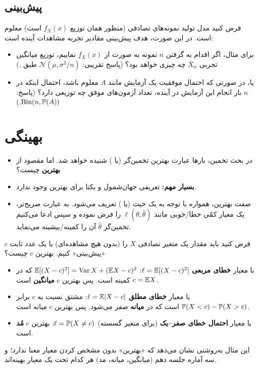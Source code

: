 \subsection{پیش‌بینی }
فرض کنید مدل تولید نمونه‌های تصادفی (منظور همان توزیع $f_X(x)$ است) معلوم است. در این صورت، هدف پیش‌بینی مقادیر تجربه مشاهدات آینده است:
\begin{itemize}
\item برای مثال، اگر اقدام به گرفتن $n$ نمونه به صورت  از $f_X(x)$ نماییم، توزیع میانگین تجربی $\bar X_n$ چه چیزی خواهد بود؟ (پاسخ تقریبی: $\mathcal N(\mu,\sigma^2/n)$ طبق .)
\item یا، در صورتی که احتمال موفقیت یک آزمایش مانند $A$ معلوم باشد، احتمال اینکه در $n$ بار انجام این آزمایش در آینده، تعداد آزمون‌های موفق چه توزیعی دارد؟ (پاسخ: $\mathrm{Bin}(n,\mathbb{P}(A))$.)
\end{itemize}

\section{بهینگی }
\begin{itemize}
\item در بحث تخمین، بارها عبارت بهترین تخمین‌گر (یا ) شنیده خواهد شد. اما مقصود از \textbf{بهترین} چیست؟
\item \textcolor{red!70!black}{\textbf{بسیار مهم:}} تعریفی جهان‌شمول و یکتا برای بهترین وجود ندارد.
\item صفت بهترین، همواره با توجه به یک حیث (یا ) تعریف می‌شود. به عبارت صریح‌تر، یک معیار کمّی خطا/خوبی مانند $\ell(\theta,\hat\theta)$ را فرض نموده و سپس ادعا می‌کنیم تخمین‌گر $\hat\theta$ آن را کمینه/بیشینه می‌نماید.
\end{itemize}

\begin{example}
فرض کنید باید مقدار یک متغیر تصادفی $X$ را (بدون هیچ مشاهده‌ای) با یک عدد ثابت $c$ «پیش‌بینی» کنیم. بهترین $c$ چیست؟
\begin{solution}
\begin{itemize}
\item با معیار \textbf{خطای مربعی} $\ell=\mathbb{E}[(X-c)^2]$: $\mathbb{E}[(X-c)^2]=\operatorname{Var} X+(\mathbb{E} X-c)^2$ که در $c=\mathbb{E} X$ کمینه است. پس بهترین $c$ \textbf{میانگین} است.
\item با معیار \textbf{خطای مطلق} $\ell=\mathbb{E}|X-c|$: مشتق نسبت به $c$ برابر $\mathbb{P}(X<c)-\mathbb{P}(X>c)$ است که در \textbf{میانه} صفر می‌شود. پس بهترین $c$ میانه است.
\item با معیار \textbf{احتمال خطای صفر--یک} (برای متغیر گسسته) $\ell=\mathbb{P}(X\ne c)$: بهترین $c$ \textbf{مُد} است.
\end{itemize}
این مثال به‌روشنی نشان می‌دهد که «بهترین» بدون مشخص کردن معیار معنا ندارد؛ و سه آماره جلسه دهم (میانگین، میانه، مد) هر کدام تحت یک معیار بهینه‌اند.
\end{solution}
\end{example}

